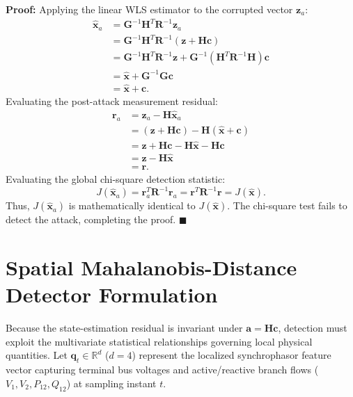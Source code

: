\documentclass[11pt,a4paper]{report}
\begin{document}
\noindent\textbf{Proof:}
Applying the linear WLS estimator to the corrupted vector $\boldsymbol{z}_a$:
\begin{align}
\hat{\boldsymbol{x}}_a &= \boldsymbol{G}^{-1} \boldsymbol{H}^T \boldsymbol{R}^{-1} \boldsymbol{z}_a \nonumber \\
&= \boldsymbol{G}^{-1} \boldsymbol{H}^T \boldsymbol{R}^{-1} (\boldsymbol{z} + \boldsymbol{H}\boldsymbol{c}) \nonumber \\
&= \boldsymbol{G}^{-1} \boldsymbol{H}^T \boldsymbol{R}^{-1} \boldsymbol{z} + \boldsymbol{G}^{-1} (\boldsymbol{H}^T \boldsymbol{R}^{-1} \boldsymbol{H})\boldsymbol{c} \nonumber \\
&= \hat{\boldsymbol{x}} + \boldsymbol{G}^{-1}\boldsymbol{G}\boldsymbol{c} \nonumber \\
&= \hat{\boldsymbol{x}} + \boldsymbol{c}.
\end{align}
Evaluating the post-attack measurement residual:
\begin{align}
\boldsymbol{r}_a &= \boldsymbol{z}_a - \boldsymbol{H}\hat{\boldsymbol{x}}_a \nonumber \\
&= (\boldsymbol{z} + \boldsymbol{H}\boldsymbol{c}) - \boldsymbol{H}(\hat{\boldsymbol{x}} + \boldsymbol{c}) \nonumber \\
&= \boldsymbol{z} + \boldsymbol{H}\boldsymbol{c} - \boldsymbol{H}\hat{\boldsymbol{x}} - \boldsymbol{H}\boldsymbol{c} \nonumber \\
&= \boldsymbol{z} - \boldsymbol{H}\hat{\boldsymbol{x}} \nonumber \\
&= \boldsymbol{r}.
\end{align}
Evaluating the global chi-square detection statistic:
\begin{equation}
J(\hat{\boldsymbol{x}}_a) = \boldsymbol{r}_a^T \boldsymbol{R}^{-1} \boldsymbol{r}_a = \boldsymbol{r}^T \boldsymbol{R}^{-1} \boldsymbol{r} = J(\hat{\boldsymbol{x}}).
\end{equation}
Thus, $J(\hat{\boldsymbol{x}}_a)$ is mathematically identical to $J(\hat{\boldsymbol{x}})$. The
chi-square test fails to detect the attack, completing the proof. \hfill $\blacksquare$

\section{Spatial Mahalanobis-Distance Detector Formulation}
Because the state-estimation residual is invariant under $\boldsymbol{a} = \boldsymbol{H}\boldsymbol{c}$,
detection must exploit the multivariate statistical relationships governing local physical
quantities. Let $\boldsymbol{q}_t \in \mathbb{R}^d$ ($d=4$) represent the localized synchrophasor
feature vector capturing terminal bus voltages and active/reactive branch flows ($V_1, V_2, P_{12}, Q_{12}$)
at sampling instant $t$.
\end{document}
